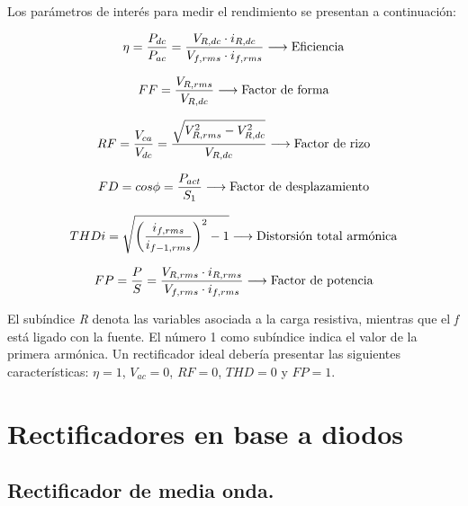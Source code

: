 \documentclass[isoft]{ssltexposter}
\begin{document}
\begin{poster}
Los parámetros de interés para medir el rendimiento se presentan a continuación:

\begin{equation}
    \eta = \frac{P_{dc}}{P_{ac}} = \frac{V_{R,dc}\cdot i_{R,dc}}{V_{f,rms}\cdot i_{f,rms}} \longrightarrow \textup{Eficiencia}
\end{equation}

\begin{equation}
    FF = \frac{V_{R,rms}}{V_{R,dc}} \longrightarrow \textup{Factor de forma}
\end{equation}

\begin{equation}
    RF= \frac{V_{ca}}{V_{dc}} = \frac{\sqrt{V_{R,rms}^2-V_{R,dc}^2}}{V_{R,dc}} \longrightarrow \textup{Factor de rizo}
\end{equation}

\begin{equation}
    FD= cos\phi = \frac{P_{act}}{S_{1}}\longrightarrow \textup{Factor de desplazamiento}
\end{equation}

\begin{equation}
    THDi=\sqrt{\left( \frac{i_{f,rms}}{i_{f-1,rms}}\right)^2-1} \longrightarrow \textup{Distorsión total armónica}
\end{equation}

\begin{equation}
    FP= \frac{P}{S}= \frac{V_{R,rms}\cdot i_{R,rms}}{V_{f,rms}\cdot i_{f,rms}}  \longrightarrow \textup{Factor de potencia}
\end{equation}
\vspace{0.2in}

El subíndice \textit{R} denota las variables asociada a la carga resistiva, mientras que el \textit{f} está ligado con la fuente. El número 1 como subíndice indica el valor de la primera armónica.
Un rectificador ideal debería presentar las siguientes características: $\eta=1$, $V_{ac}=0$, $RF=0$, $THD=0$ y $FP=1$.


\section{Rectificadores en base a diodos}
\subsection{Rectificador de media onda.}


\end{poster}
\end{document}
